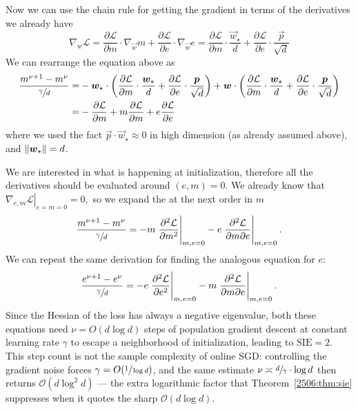  Now we can use the chain rule for getting the gradient in terms of the derivatives we already have
 \[
    \nabla_w \mathcal{L} = \frac{\partial \mathcal{L}}{\partial m}\cdot \nabla_{\vec{w}}m + \frac{\partial \mathcal{L}}{\partial e}\cdot \nabla_{\vec{w}}e =
    \frac{\partial \mathcal{L}}{\partial m}\cdot \frac{\vec{w}_\star}{d} + \frac{\partial \mathcal{L}}{\partial e}\cdot \frac{\vec p}{\sqrt{d}}
 \]
 We can rearrange the equation above as
 \[\begin{split}
    \frac{m^{\nu+1} - m^\nu}{\sfrac{\gamma}{d}} =& -{\boldsymbol{w}}_\star \cdot \left(\frac{\partial \mathcal{L}}{\partial m}\cdot \frac{{\boldsymbol{w}}_\star}{d} + \frac{\partial \mathcal{L}}{\partial e}\cdot \frac{{\boldsymbol{p}}}{\sqrt{d}}\right) + {\boldsymbol{w}} \cdot \left(\frac{\partial \mathcal{L}}{\partial m}\cdot \frac{{\boldsymbol{w}}_\star}{d} + \frac{\partial \mathcal{L}}{\partial e}\cdot \frac{{\boldsymbol{p}}}{\sqrt{d}}\right) \\=& -\frac{\partial \mathcal{L}}{\partial m} + m\frac{\partial \mathcal{L}}{\partial m} + e\frac{\partial \mathcal{L}}{\partial e}
 \end{split}\]
 where we used the fact \(\vec p \cdot \vec{w}_\star \approx 0\) in high dimension (as already assumed above), and \(\left\lVert {\boldsymbol{w}}_\star\right\rVert=d\).

 We are interested in what is happening at initialization, therefore all the derivatives should be evaluated around \((e,m)=0\). We already know that \(\left.\nabla_{e,m}\mathcal{L}\right|_{e=m=0}=0,\) so we expand the at the next order in \(m\)
\[
 \frac{m^{\nu+1} - m^\nu}{\sfrac{\gamma}{d}} =
    -m\left.\frac{\partial^2 \mathcal{L}}{\partial m^2}\right|_{m,e=0} - e \left.\frac{\partial^2 \mathcal{L}}{\partial m\partial e}\right|_{m,e=0}.
 \]
 We can repeat the same derivation for finding the analogous equation for \(e\):
 \[
 \frac{e^{\nu+1} - e^\nu}{\sfrac{\gamma}{d}} =
    -e\left.\frac{\partial^2 \mathcal{L}}{\partial e^2}\right|_{m,e=0} - m \left.\frac{\partial^2 \mathcal{L}}{\partial m\partial e}\right|_{m,e=0}.
 \]
 Since the Hessian of the loss has always a negative eigenvalue, both these equations need \(\nu = O(d\log d)\) steps of population gradient descent at constant learning rate \(\gamma\) to escape a neighborhood of initialization, leading to \(\mathrm{SIE}=2\). This step count is not the sample complexity of online SGD: controlling the gradient noise forces \(\gamma = O(\sfrac{1}{\log d})\), and the same estimate \(\nu \asymp \sfrac{d}{\gamma}\cdot\log d\) then returns \(\mathcal{O}(d\log^2 d)\) --- the extra logarithmic factor that Theorem~\ref{2506:thm:sie} suppresses when it quotes the sharp \(\mathcal{O}(d\log d)\).

